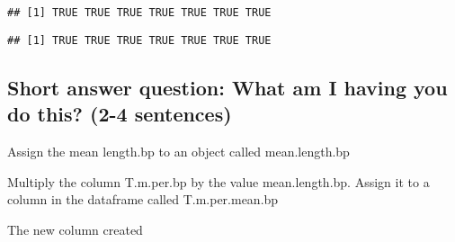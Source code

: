 \documentclass[
]{book}
\newenvironment{Shaded}{\begin{snugshade}}{\end{snugshade}}
\newcommand{\FunctionTok}[1]{\textcolor[rgb]{0.00,0.00,0.00}{#1}}
\newcommand{\NormalTok}[1]{#1}
\newcommand{\OtherTok}[1]{\textcolor[rgb]{0.56,0.35,0.01}{#1}}
\newcommand{\SpecialCharTok}[1]{\textcolor[rgb]{0.00,0.00,0.00}{#1}}
\begin{document}
\begin{verbatim}
## [1] TRUE TRUE TRUE TRUE TRUE TRUE TRUE
\end{verbatim}

\begin{Shaded}
\end{Shaded}

\begin{verbatim}
## [1] TRUE TRUE TRUE TRUE TRUE TRUE TRUE
\end{verbatim}

\hypertarget{short-answer-question-what-am-i-having-you-do-this-2-4-sentences}{%
\subsection{Short answer question: What am I having you do this? (2-4 sentences)}\label{short-answer-question-what-am-i-having-you-do-this-2-4-sentences}}

Assign the mean length.bp to an object called mean.length.bp

\begin{Shaded}
\end{Shaded}

Multiply the column T.m.per.bp by the value mean.length.bp. Assign it to a column in the dataframe called T.m.per.mean.bp

\begin{Shaded}
\end{Shaded}

The new column created

\begin{Shaded}
\end{Shaded}
\end{document}
